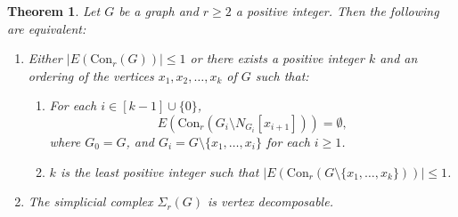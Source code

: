 \documentclass[12pt,reqno]{amsart}
\newtheorem{theorem}[proposition]{Theorem}
\theoremstyle{definition}
\newcommand{\Con}{{\mathrm{Con}}}
\begin{document}
\begin{theorem}\label{V.D of Sigma_r(G)}
		Let $G$ be a graph and $r\ge 2$ a positive integer. Then the following are equivalent:
		\begin{enumerate}
			\item Either $|E(\Con_r(G))|\le 1$ or there exists a positive integer $k$ and an ordering of the vertices $x_1,x_2,\ldots,x_k$ of $G$ such that:
			\begin{enumerate}
				\item For each $i\in [k-1]\cup\{0\}$,
				\[ E\left(\Con_r(G_i\setminus N_{G_i}[x_{i+1}])\right) = \emptyset,\]
				where $G_0=G$, and $G_i=G\setminus\{x_1,\ldots,x_i\}$ for each $i\ge 1$.
				\item $k$ is the least positive integer such that $|E(\Con_r(G\setminus\{x_1,\ldots,x_k\}))|\le 1$.
			\end{enumerate}
			\item The simplicial complex $\Sigma_r(G)$ is vertex decomposable.
		\end{enumerate}
	\end{theorem}
\end{document}
